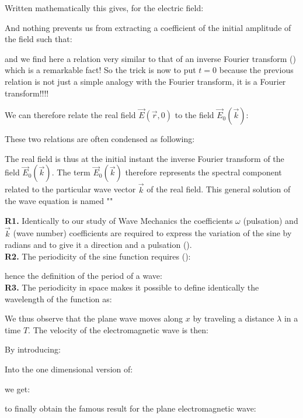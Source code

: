 	Written mathematically this gives, for the electric field:
	
	And nothing prevents us from extracting a coefficient of the initial amplitude of the field such that:
	
	and we find here a relation very similar to that of an inverse Fourier transform () which is a remarkable fact! So the trick is now to put $t=0$ because the previous relation is not just a simple analogy with the Fourier transform, it is a Fourier transform!!!!

	We can therefore relate the real field $\vec{E}(\vec{r},0)$ to the field $\vec{E}_0(\vec{k})$:
	
	These two relations are often condensed as following:
	
	The real field is thus at the initial instant the inverse Fourier transform of the field $\vec{E}_0(\vec{k})$. The term $\vec{E}_0(\vec{k})$ therefore represents the spectral component related to the particular wave vector $\vec{k}$ of the real field. This general solution of the wave equation is named ""
	\begin{tcolorbox}[title=Remarks,colframe=black,arc=10pt]
	\textbf{R1.} Identically to our study of Wave Mechanics the coefficients $\omega$ (pulsation) and $\vec{k}$ (wave number) coefficients are required to express the variation of the sine by radians and to give it a direction and a pulsation ().\\

	\textbf{R2.} The periodicity of the sine function requires ():
	
	hence the definition of the period of a wave:
	\\

	\textbf{R3.} The periodicity in space makes it possible to define identically the wavelength of the function as:
	
	We thus observe that the plane wave moves along $x$ by traveling a distance $\lambda$ in a time $T$. The velocity of the electromagnetic wave is then:
	
	\end{tcolorbox}
	By introducing:
	
	Into the one dimensional version of:
	
	we get:
	
	to finally obtain the famous result for the plane electromagnetic wave:
	
